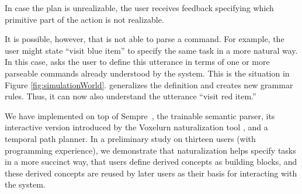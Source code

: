 In case the plan is unrealizable, the user receives feedback specifying which primitive part of the
action is not realizable.

It is possible, however, that \tool is not able to parse a command.
For example, the user might state ``visit blue item'' to specify the same task in a more natural way.
In this case, \tool asks the user to define this utterance
in terms of one or more parseable commands already understood by the system.
This is the situation in Figure \ref{fig:simulationWorld}.
\tool generalizes the definition and creates new grammar rules.
Thus, it can now also understand the utterance ``visit red item.''


We have implemented \tool on top of Sempre~\cite{berantSempre}, the trainable semantic parser, its interactive version introduced by the Voxelurn
naturalization tool \cite{wangVoxelurn}, and a temporal path planner.
In a preliminary study on thirteen users (with programming experience), we demonstrate that naturalization
helps specify tasks in a more succinct way, that users define derived concepts as building blocks,
and these derived concepts are reused by later users as their basis for interacting with the system.



